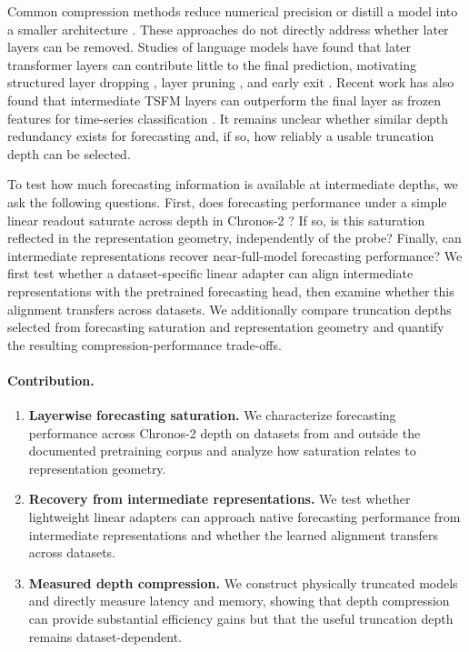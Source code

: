 \documentclass{article}
\begin{document}
Common compression methods reduce numerical precision \citep{frantar2023gptqaccurateposttrainingquantization} or distill a model into a smaller architecture \citep{hinton2015distillingknowledgeneuralnetwork, sanh2020distilbertdistilledversionbert}. These approaches do not directly address whether later layers can be removed. Studies of language models have found that later transformer layers can contribute little to the final prediction, motivating structured layer dropping \citep{fan2019reducingtransformerdepthdemand}, layer pruning \citep{gromov2025unreasonableineffectivenessdeeperlayers, men2024shortgptlayerslargelanguage}, and early exit \citep{teerapittayanon2017branchynetfastinferenceearly, schwartz2020righttooljobmatching, Elhoushi_2024}. Recent work has also found that intermediate TSFM layers can outperform the final layer as frozen features for time-series classification \citep{feofanov2026mantisv2closingzeroshotgap}. It remains unclear whether similar depth redundancy exists for forecasting and, if so, how reliably a usable truncation depth can be selected.

To test how much forecasting information is available at intermediate depths, we ask the following questions. First, does forecasting performance under a simple linear readout saturate across depth in Chronos-2 \citep{ansari2025chronos2univariateuniversalforecasting}? If so, is this saturation reflected in the representation geometry, independently of the probe? Finally, can intermediate representations recover near-full-model forecasting performance? We first test whether a dataset-specific linear adapter can align intermediate representations with the pretrained forecasting head, then examine whether this alignment transfers across datasets. We additionally compare truncation depths selected from forecasting saturation and representation geometry and quantify the resulting compression-performance trade-offs.

\paragraph{Contribution.}
\begin{enumerate}
    \item \textbf{Layerwise forecasting saturation.}
    We characterize forecasting performance across Chronos-2 depth on datasets from and outside the documented pretraining corpus and analyze how saturation relates to representation geometry.

    \item \textbf{Recovery from intermediate representations.}
    We test whether lightweight linear adapters can approach native forecasting performance from intermediate representations and whether the learned alignment transfers across datasets.

    \item \textbf{Measured depth compression.}
    We construct physically truncated models and directly measure latency and memory, showing that depth compression can provide substantial efficiency gains but that the useful truncation depth remains dataset-dependent.
\end{enumerate}
\end{document}

